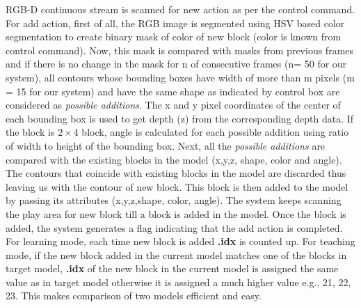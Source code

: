RGB-D continuous stream is scanned for new action as per the control command. For  add action, first of all, the RGB image is segmented using HSV based color segmentation to create binary mask of color of new block (color is known from control command). Now, this mask is compared with masks from previous frames and if there is no change in the mask for n of consecutive frames (n= 50 for our system), all contours whose bounding boxes have width of more than m pixels (m = 15 for our system) and have the same shape as indicated by control box are considered as \emph{possible additions}. The x and y pixel coordinates of the center of each bounding box is used to get depth (z) from the corresponding depth data. If the block is $2 \times 4$ block, angle is calculated for each possible addition using ratio of width to height of the bounding box. Next, all the \emph{possible additions} are compared with the existing blocks in the model (x,y,z, shape, color and angle). The contours that coincide with existing blocks in the model are discarded thus leaving us with the contour of new block. This block is then added to the model by passing its attributes (x,y,z,shape, color, angle). The system keeps scanning the play area for new block till a block is added in the model. Once the block is added, the system generates a flag indicating that the add action is completed. For learning mode, each time new block is added \textbf{.idx} is counted up. For teaching mode, if the new block added in the current model matches one of the blocks in target model, \textbf{.idx} of the new block in the current model is assigned the same value as in target model otherwise it is assigned a much higher value e.g., 21, 22, 23. This makes comparison of two models efficient and easy. \\
